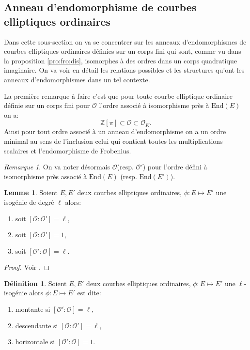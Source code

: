 \documentclass[10pt,a4paper]{book}
\theoremstyle{plain}
\theoremstyle{definition}
\newtheorem{lem}[thm]{Lemme}
\theoremstyle{definition}
\theoremstyle{definition}
\theoremstyle{definition}
\newtheorem{defi}[thm]{Définition}
\theoremstyle{remark}
\newtheorem{rem}[thm]{Remarque}
\theoremstyle{remark}
\theoremstyle{definition}
\begin{document}
\subsection{Anneau d'endomorphisme de courbes elliptiques ordinaires}
Dans cette sous-section on va se concentrer sur les anneaux d'endomorphismes de courbes elliptiques ordinaires définies sur un corps fini qui sont, comme vu dans la proposition \ref{pro:fro:dis}, isomorphes à des ordres dans un corps quadratique imaginaire. On va voir en détail les relations possibles et les structures qu'ont les anneaux d'endomorphismes dans un tel contexte.

La première remarque à faire c'est que pour toute courbe elliptique ordinaire définie sur un corps fini pour $\mathcal{O}$ l'ordre associé à isomorphisme près à $\mathrm{End}(E)$ on a: 
\[
\mathbb{Z}[\pi] \subset \mathcal{O} \subset \mathcal{O}_K.
\]
Ainsi pour tout ordre associé à un anneau d'endomorphisme on a un ordre minimal
au sens de l'inclusion celui qui contient toutes les multiplications scalaires 
et l'endomorphisme de Frobenius.

\begin{rem}
On va noter désormais $\mathcal{O}$(resp. $\mathcal{O}'$) pour l'ordre défini à isomorphisme près associé à $\mathrm{End}(E)$ (resp. $\mathrm{End}(E')$).
\end{rem}

\begin{lem}
Soient $E,E'$ deux courbes elliptiques ordinaires, $\phi: E \mapsto E'$ une isogénie de degré $\ell$ alors:
\begin{enumerate}
\item soit $[\mathcal{O} : \mathcal{O'}]=\ell$, 
\item soit $[\mathcal{O} : \mathcal{O'}]=1$,
\item soit $[\mathcal{O'} : \mathcal{O}]=\ell$.
\end{enumerate}
\end{lem}

\begin{proof}
Voir \cite[Proposition 21]{Kohel96}.
\end{proof}

\begin{defi}
\label{def:iso:nom}
Soient $E,E'$ deux courbes elliptiques ordinaires, $\phi: E \mapsto E'$ une $\ell$-isogénie alors $\phi: E \mapsto E'$ est dite:
\begin{enumerate}
\item montante si $[\mathcal{O'} : \mathcal{O}]=\ell$,
\item descendante si $[\mathcal{O} : \mathcal{O'}]=\ell$,
\item horizontale si $[\mathcal{O'} : \mathcal{O}]=1$.
\end{enumerate}
\end{defi}
\end{document}
